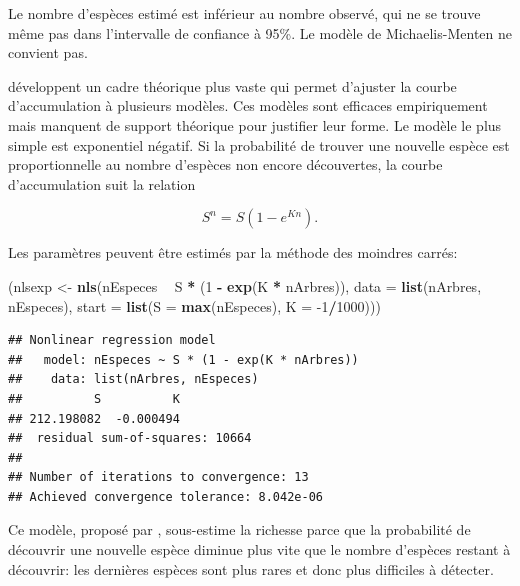 \documentclass[
  11pt,
  french,
  a4paper,
  extrafontsizes,onecolumn,openright
  ]{memoir}
\newenvironment{Shaded}{\begin{snugshade}}{\end{snugshade}}
\newcommand{\DataTypeTok}[1]{\textcolor[rgb]{0.13,0.29,0.53}{#1}}
\newcommand{\DecValTok}[1]{\textcolor[rgb]{0.00,0.00,0.81}{#1}}
\newcommand{\KeywordTok}[1]{\textcolor[rgb]{0.13,0.29,0.53}{\textbf{#1}}}
\newcommand{\NormalTok}[1]{#1}
\newcommand{\OperatorTok}[1]{\textcolor[rgb]{0.81,0.36,0.00}{\textbf{#1}}}
\newcommand{\StringTok}[1]{\textcolor[rgb]{0.31,0.60,0.02}{#1}}
\begin{document}
\normalsize

Le nombre d'espèces estimé est inférieur au nombre observé, qui ne se trouve même pas dans l'intervalle de confiance à 95\%.
Le modèle de Michaelis-Menten ne convient pas.

\textcite{Soberon1993} développent un cadre théorique plus vaste qui permet d'ajuster la courbe d'accumulation à plusieurs modèles.
Ces modèles sont efficaces empiriquement mais manquent de support théorique pour justifier leur forme.
Le modèle le plus simple est exponentiel négatif.
Si la probabilité de trouver une nouvelle espèce est proportionnelle au nombre d'espèces non encore découvertes, la courbe d'accumulation suit la relation

\begin{equation} 
  \label{eq:Soberon1993a}
  S^{n} = S \left( 1 - e^{Kn} \right).
\end{equation}

Les paramètres peuvent être estimés par la méthode des moindres carrés:

\scriptsize

\begin{Shaded}
\begin{Highlighting}[]
\NormalTok{(nlsexp <-}\StringTok{ }\KeywordTok{nls}\NormalTok{(nEspeces }\OperatorTok{~}\StringTok{ }\NormalTok{S }\OperatorTok{*}\StringTok{ }\NormalTok{(}\DecValTok{1} \OperatorTok{-}\StringTok{ }\KeywordTok{exp}\NormalTok{(K }\OperatorTok{*}\StringTok{ }\NormalTok{nArbres)), }\DataTypeTok{data =} \KeywordTok{list}\NormalTok{(nArbres, }
\NormalTok{    nEspeces), }\DataTypeTok{start =} \KeywordTok{list}\NormalTok{(}\DataTypeTok{S =} \KeywordTok{max}\NormalTok{(nEspeces), }\DataTypeTok{K =} \DecValTok{-1}\OperatorTok{/}\DecValTok{1000}\NormalTok{)))}
\end{Highlighting}
\end{Shaded}

\begin{verbatim}
## Nonlinear regression model
##   model: nEspeces ~ S * (1 - exp(K * nArbres))
##    data: list(nArbres, nEspeces)
##          S          K 
## 212.198082  -0.000494 
##  residual sum-of-squares: 10664
## 
## Number of iterations to convergence: 13 
## Achieved convergence tolerance: 8.042e-06
\end{verbatim}

\normalsize

Ce modèle, proposé par \textcite{Holdridge1971}, sous-estime la richesse parce que la probabilité de découvrir une nouvelle espèce diminue plus vite que le nombre d'espèces restant à découvrir: les dernières espèces sont plus rares et donc plus difficiles à détecter.
\end{document}
